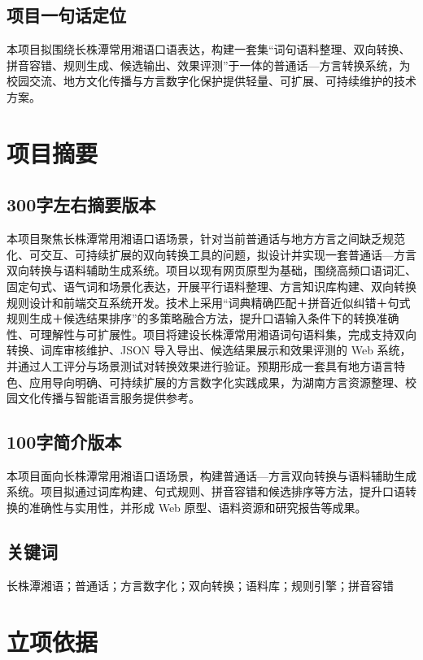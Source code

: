 \documentclass[12pt,a4paper]{ctexart}
\begin{document}
\subsection{项目一句话定位}

本项目拟围绕长株潭常用湘语口语表达，构建一套集“词句语料整理、双向转换、拼音容错、规则生成、候选输出、效果评测”于一体的普通话—方言转换系统，为校园交流、地方文化传播与方言数字化保护提供轻量、可扩展、可持续维护的技术方案。

\section{项目摘要}

\subsection{300字左右摘要版本}

本项目聚焦长株潭常用湘语口语场景，针对当前普通话与地方方言之间缺乏规范化、可交互、可持续扩展的双向转换工具的问题，拟设计并实现一套普通话—方言双向转换与语料辅助生成系统。项目以现有网页原型为基础，围绕高频口语词汇、固定句式、语气词和场景化表达，开展平行语料整理、方言知识库构建、双向转换规则设计和前端交互系统开发。技术上采用“词典精确匹配＋拼音近似纠错＋句式规则生成＋候选结果排序”的多策略融合方法，提升口语输入条件下的转换准确性、可理解性与可扩展性。项目将建设长株潭常用湘语词句语料集，完成支持双向转换、词库审核维护、JSON 导入导出、候选结果展示和效果评测的 Web 系统，并通过人工评分与场景测试对转换效果进行验证。预期形成一套具有地方语言特色、应用导向明确、可持续扩展的方言数字化实践成果，为湖南方言资源整理、校园文化传播与智能语言服务提供参考。

\subsection{100字简介版本}

本项目面向长株潭常用湘语口语场景，构建普通话—方言双向转换与语料辅助生成系统。项目拟通过词库构建、句式规则、拼音容错和候选排序等方法，提升口语转换的准确性与实用性，并形成 Web 原型、语料资源和研究报告等成果。

\subsection{关键词}

长株潭湘语；普通话；方言数字化；双向转换；语料库；规则引擎；拼音容错

\section{立项依据}
\end{document}
